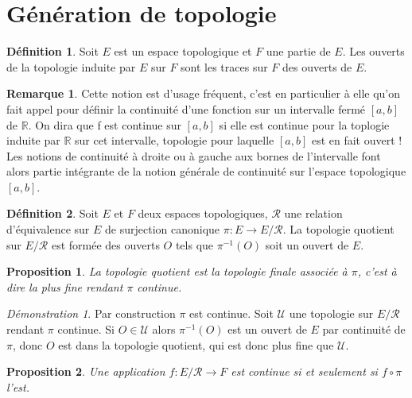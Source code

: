 \documentclass[a4paper, 11pt, french]{book}
\theoremstyle{plain} %
\newtheorem{proposition}{Proposition}
\theoremstyle{definition} %
\newtheorem{definition}{Définition}
\newtheorem{remarque}{Remarque}
\theoremstyle{remark} %
\newtheorem*{demonstration}{Démonstration}
\newcommand{\1}{\mathds{1}}
\newcommand{\inv}[1]{#1^{-1}}
\newcommand{\R}{\mathbb{R}}
\newcommand{\scr}[1]{\mathscr{#1}}
\begin{document}
\section{Génération de topologie}

\begin{definition}
	Soit $E$ est un espace topologique et $F$ une partie de $E$.
	Les ouverts de la topologie induite par $E$ sur $F$ sont les traces sur $F$ des ouverts de $E$.
\end{definition}

\begin{remarque}
	Cette notion est d’usage fréquent, c’est en particulier à elle qu’on fait appel pour définir la continuité d’une fonction sur un intervalle fermé $[a, b]$ de $\R$.
	On dira que f est continue sur $[a, b]$ si elle est continue pour la toplogie induite par $\R$ sur cet intervalle, topologie pour laquelle $[a, b]$ est en fait ouvert !
	Les notions de continuité à droite ou à gauche aux bornes de l’intervalle font alors partie intégrante de la notion générale de continuité sur l’espace topologique $[a, b]$.
\end{remarque}

\begin{definition}
	Soit $E$ et $F$ deux espaces topologiques, $\mathcal{R}$ une relation d’équivalence sur $E$ de surjection canonique $\pi\colon E\rightarrow E/\mathcal{R}$.
	La topologie quotient sur $E/\mathcal{R}$ est formée des ouverts $O$ tels que $\inv{\pi}(O)$ soit un ouvert de $E$.
\end{definition}

\begin{proposition}
	La topologie quotient est la topologie finale associée à $\pi$, c'est à dire la plus fine rendant $\pi$ continue.
\end{proposition}

\begin{demonstration}
	Par construction $\pi$ est continue.
	Soit $\scr{U}$ une topologie sur $E/\mathcal{R}$ rendant $\pi$ continue.
	Si $O\in\scr{U}$ alors $\inv{\pi}(O)$ est un ouvert de $E$ par continuité de $\pi$, donc $O$ est dans la topologie quotient, qui est donc plus fine que $\scr{U}$.
\end{demonstration}

\begin{proposition}
	Une application $f\colon E/\mathcal{R}\rightarrow F$ est continue si et seulement si $f\circ\pi$ l'est.
\end{proposition}
\end{document}
